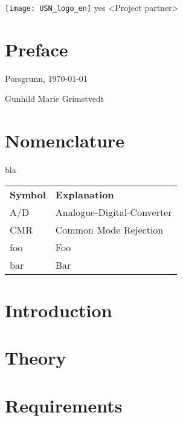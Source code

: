 \documentclass[%
]{USN-MSc}
\newcommand{\myauthor}{%
Gunhild Marie Grimstvedt
}
\newcommand{\myparticipants}{
<First participant>\\
<Second participant>\\
<Third participant>\\
<Fourth participant>
}
\begin{document}
\USNtitlepage%
{%
  {}
   \texttt{[image: USN\_logo\_en]}}
{yes} %
{<Project partner>}
{%
\lipsum[6-7]
}

\chapter*{Preface}
\label{sec:preface}
\lipsum[1-3]
\bigskip
Porsgrunn, \today

\myauthor %


\tableofcontents
{}

\listoffigures %

\listoftables  %

\chapter*{Nomenclature}
\label{sec:nomenclature}
bla

\begin{longtable}{ll}
  \textbf{Symbol} & \textbf{Explanation}\endhead\\
  A/D	& Analogue-Digital-Converter \\
  CMR	& Common Mode Rejection \\
  foo	& Foo \\
  bar 	& Bar
\end{longtable}

\chapter{Introduction}
\label{ch:intro}


\chapter{Theory}
\label{ch:theory}


\chapter{Requirements}
\label{ch:requirements}

\end{document}
